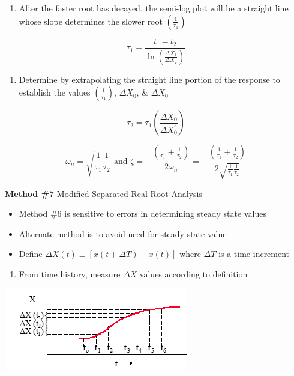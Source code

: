 \documentclass[
]{book}
\providecommand{\tightlist}{%
  \setlength{\itemsep}{0pt}\setlength{\parskip}{0pt}}
\begin{document}
\begin{enumerate}
\def\labelenumi{\arabic{enumi}.}
\setcounter{enumi}{2}
\tightlist
\item
  After the faster root has decayed, the semi-log plot will be a straight line whose slope determines the slower root \(\left( \frac{1}{\tau_1} \right)\)
\end{enumerate}

\[
\tau_1 = \frac{t_1 - t_2}{\ln \left(\frac{\Delta X_1}{\Delta X_2} \right)}
\]

\begin{enumerate}
\def\labelenumi{\arabic{enumi}.}
\setcounter{enumi}{3}
\tightlist
\item
  Determine by extrapolating the straight line portion of the response to establish the values \(\left( \frac{1}{\tau_1} \right)\), \(\Delta\overline{X}_0\), \& \(\Delta X_0^{\prime}\)
\end{enumerate}

\[
\tau_2 = \tau_1 \left( \frac{\Delta\overline{X}_0}{\Delta X_0^{\prime}} \right)
\]

\[
\omega_n = \sqrt{\frac{1}{\tau_1}\frac{1}{\tau_2}} \text{ and } \zeta = - \frac{\left(\frac{1}{\tau_1} + \frac{1}{\tau_2} \right)}{2 \omega_n} = - \frac{\left( \frac{1}{\tau_1} + \frac{1}{\tau_2} \right)}{2 \sqrt{\frac{1}{\tau_1}\frac{1}{\tau_2}}}
\]

\textbf{Method \#7} Modified Separated Real Root Analysis

\begin{itemize}
\tightlist
\item
  Method \#6 is sensitive to errors in determining steady state values
\item
  Alternate method is to avoid need for steady state value
\item
  Define \(\Delta X \left(t \right) \equiv \left[ x \left(t + \Delta T \right) - x \left(t \right) \right]\) where \(\Delta T\) is a time increment
\end{itemize}

\begin{enumerate}
\def\labelenumi{\arabic{enumi}.}
\tightlist
\item
  From time history, measure \(\Delta X\) values according to definition
\end{enumerate}

\includegraphics{media/08/image91.png}
\end{document}
